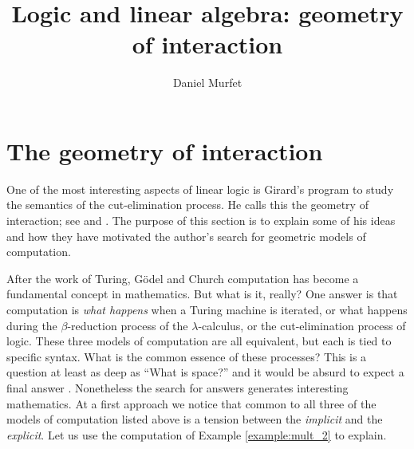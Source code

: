 \documentclass[english,letter paper,12pt,reqno]{article}
\theoremstyle{example}
\numberwithin{equation}{section}
\def\res{\operatorname{Res}}
\begin{document}
\def\ScoreOverhang{1pt}

\def\Res{\res\!}
\newcommand{\ud}[1]{\operatorname{d}\!{#1}}
\newcommand{\Ress}[1]{\res_{#1}\!}
\newcommand{\cat}[1]{\mathcal{#1}}
\newcommand{\lto}{\longrightarrow}
\newcommand{\xlto}[1]{\stackrel{#1}\lto}
\newcommand{\mf}[1]{\mathfrak{#1}}
\newcommand{\md}[1]{\mathscr{#1}}
\newcommand{\church}[1]{\underline{#1}}
\newcommand{\prf}[1]{\underline{#1}}
\newcommand{\den}[1]{\llbracket #1 \rrbracket}
\def\l{\,|\,}
\def\sgn{\textup{sgn}}
\def\cont{\operatorname{cont}}

\title{Logic and linear algebra: geometry of interaction}
\author{Daniel Murfet}

\maketitle

\section{The geometry of interaction}\label{section:goi}

One of the most interesting aspects of linear logic is Girard's program to study the semantics of the cut-elimination process. He calls this the geometry of interaction; see \cite[\S III]{girard_towards} and \cite{girard_goi1,girard_goi2,girard_goi3}. The purpose of this section is to explain some of his ideas and how they have motivated the author's search for geometric models of computation. 

After the work of Turing, G\"odel and Church \cite{soare} computation has become a fundamental concept in mathematics. But what is it, really? One answer is that computation is \emph{what happens} when a Turing machine is iterated, or what happens during the $\beta$-reduction process of the $\lambda$-calculus, or the cut-elimination process of logic. These three models of computation are all equivalent, but each is tied to specific syntax. What is the common essence of these processes? This is a question at least as deep as ``What is space?'' and it would be absurd to expect a final answer \cite{denning}. Nonetheless the search for answers generates interesting mathematics. At a first approach we notice that common to all three of the models of computation listed above is a tension between the \emph{implicit} and the \emph{explicit}. Let us use the computation of Example \ref{example:mult_2} to explain.  
\end{document}
